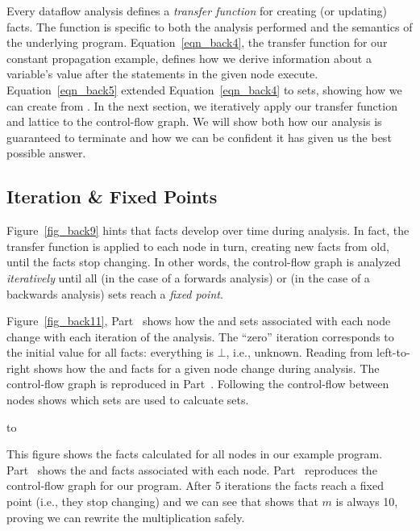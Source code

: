 \documentclass[12pt]{report}
\begin{document}
\afterpage{\clearpage\clearpage}

Every dataflow analysis defines a \emph{transfer function} for
creating (or updating) facts. The function is specific to both the
analysis performed and the semantics of the underlying
program. Equation~\ref{eqn_back4}, the transfer function for our
constant propagation example, defines how we derive information about
a variable's value after the statements in the given node execute.
Equation~\ref{eqn_back5} extended Equation~\ref{eqn_back4} to sets,
showing how we can create \outBa from \inBa. In the next section, we
iteratively apply our transfer function and lattice to the
control-flow graph. We will show both how our analysis is guaranteed
to terminate and how we can be confident it has given us the best
possible answer.

\subsection{Iteration \& Fixed Points}
\label{back_subsec_iter}

Figure~\ref{fig_back9} hints that facts
develop over time during analysis. In fact, the transfer function is
applied to each node in turn, creating new facts from old, until the
facts stop changing. In other words, the control-flow graph is
analyzed \emph{iteratively} until all \out (in the case of a forwards
analysis) or \inE (in the case of a backwards analysis) sets reach a
\emph{fixed point}.

Figure~\ref{fig_back11}, Part~ shows how the
\inE and \out sets associated with each node change with each
iteration of the analysis. The ``zero'' iteration corresponds to the
initial value for all facts: everything is $\bot$, i.e.,
unknown. Reading from left-to-right shows how the \inE and \out facts
for a given node change during analysis. The control-flow graph is
reproduced in Part~. Following the control-flow
between nodes shows which \out sets are used to calcuate \inE sets.

\begin{myfig}
  \setlength{\tabcolsep}{2pt}
  \hbox to 
  \caption{This figure shows the facts calculated for all nodes in our
    example program. Part~ shows the \inE and
    \out facts associated with each node. Part~
    reproduces the control-flow graph for our program. After 5
    iterations the facts reach a fixed point (i.e., they stop
    changing) and we can see that  shows that $m$
    is always 10, proving we can rewrite the multiplication safely. }
  \label{fig_back11}
\end{myfig}
\end{document}

